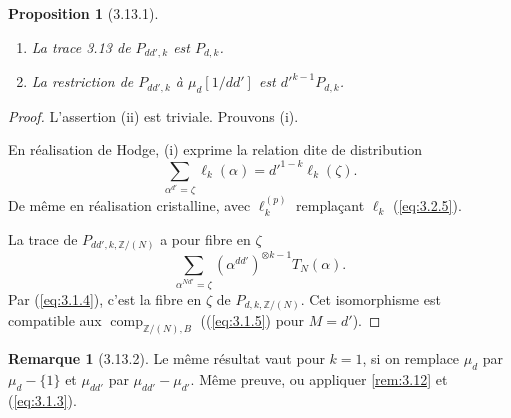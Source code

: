 \documentclass[12pt,a4paper]{article}
\theoremstyle{plain}
\newtheorem{proposition}[theorem]{Proposition}
\theoremstyle{definition}
\newtheorem{remark}[theorem]{Remarque}
\theoremstyle{remark}
\providecommand{\comp}{\operatorname{comp}}
\begin{document}
\begin{proposition}[3.13.1]\label{prop:3.13.1}
\leavevmode
\begin{enumerate}[label=(\roman*)]
\item La trace 3.13 de $P_{dd',k}$ est $P_{d,k}$.
\item La restriction de $P_{dd',k}$ \`a $\mu_d[1/dd']$ est $d'^{k-1} P_{d,k}$.
\end{enumerate}
\end{proposition}
\begin{proof}
L'assertion (ii) est triviale. Prouvons (i).

En r\'ealisation de Hodge, (i) exprime la relation dite de distribution
\[
\sum_{\alpha^{d'}=\zeta} \ell_k(\alpha) = d'^{1-k} \ell_k(\zeta).
\]
De m\^eme en r\'ealisation cristalline, avec $\ell_k^{(p)}$ rempla\c{c}ant $\ell_k$
(\ref{eq:3.2.5}).

La trace de $P_{dd',k,\mathbb{Z}/(N)}$ a pour fibre en $\zeta$
\[
\sum_{\alpha^{Nd'}=\zeta} (\alpha^{dd'})^{\otimes k-1} T_N(\alpha).
\]
Par (\ref{eq:3.1.4}), c'est la fibre en $\zeta$ de $P_{d,k,\mathbb{Z}/(N)}$. Cet
isomorphisme est compatible aux $\comp_{\mathbb{Z}/(N),B}$ ((\ref{eq:3.1.5}) pour
$M = d'$).
\end{proof}

\begin{remark}[3.13.2]\label{rem:3.13.2}
Le m\^eme r\'esultat vaut pour $k = 1$, si on remplace $\mu_d$ par $\mu_d - \{1\}$ et
$\mu_{dd'}$ par $\mu_{dd'} - \mu_{d'}$. M\^eme preuve, ou appliquer \ref{rem:3.12} et
(\ref{eq:3.1.3}).
\end{remark}
\end{document}
